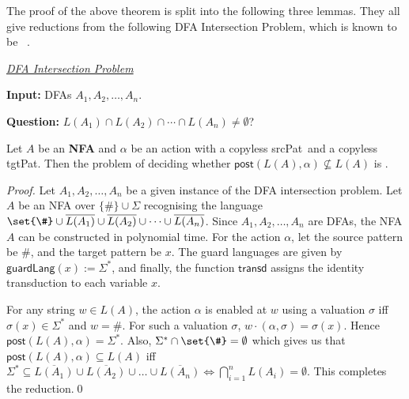 \documentclass[12pt, a4paper]{article}
\newcommand{\T}{\textsf{transd}}
\newcommand{\post}{\textsf{post}}
\newcommand{\spat}{\textsf{srcPat}}
\newcommand{\tpat}{\textsf{tgtPat}}
\newcommand{\guardL}{\textsf{guardLang}}
\newcommand{\alphabet}{\Sigma}
\begin{document}
The proof of the above theorem is split into the following three lemmas. 
They all give reductions from the following DFA Intersection Problem, which is known to be \pspc\ \cite{K1977}.
\medskip

\uline{\emph{DFA Intersection Problem}}

\textbf{Input:} DFAs $A_1,A_2, \ldots, A_n$.

\textbf{Question:} $L(A_1) \cap L(A_2) \cap \cdots \cap L(A_n) \neq \emptyset$?

%
\begin{lemma}
	Let $A$ be an \textbf{NFA}  and  $\alpha$ be an action 
	 with a copyless \spat\ and a copyless \tpat. Then the 
	problem of deciding whether $\post(L(A), \alpha) \not\subseteq L(A)$ 
	is \psph. 
\end{lemma}
%
\begin{proof}
	Let $A_1, A_2, \dots, A_n$ be a given instance of the DFA intersection problem. Let $A$ be an NFA over $\{\#\} \cup \alphabet$ recognising
	the language $\set{\#} \cup \overline{L(A_1)} \cup \overline{L(A_2)} \cup \cdots \cup \overline{L(A_n)}$. Since $A_1, A_2, \dots, A_n$ are
	DFAs, the NFA $A$ can be constructed in polynomial time. For the action $\alpha$, let the source pattern be \#, and the target pattern be
	$x$. The guard languages are given by $\guardL(x) := \Sigma^*$, and finally, the function $\T$ assigns the identity transduction to each
	variable $x$.

	For any string  $w \in L(A)$, the action $\alpha$ is enabled at $w$ using a valuation $\sigma$ iff $\sigma(x)\in \Sigma^*$ and $w = \#$.
	For such a valuation $\sigma$, $w \cdot(\alpha,\sigma)=\sigma(x)$. Hence $\post(L(A), \alpha) = \Sigma^*$. Also,
	$\Sigma^* \cap \set{\#} = \emptyset$ which gives us that $\post(L(A), \alpha) \subseteq L(A)$ iff
	$\Sigma^* \subseteq \overline{L(A_1)} \cup \overline{L(A_2)} \cup \dots \cup \overline{L(A_n)} \iff \bigcap_{i=1}^n L(A_i) = \emptyset$.
	This completes the reduction.\qed
\end{proof}
\end{document}
